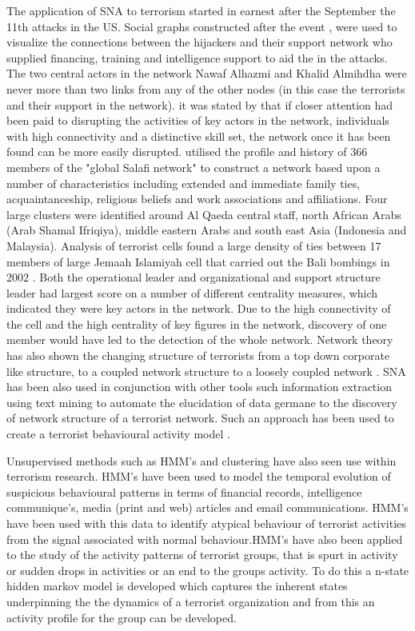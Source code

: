 The application of SNA to terrorism started in earnest after the September the 11th attacks in the US. Social graphs constructed after the event \citep{krebs2002mapping}, \citep{krebs2002uncloaking}  were used to visualize the connections between the hijackers and their support network who supplied financing, training and intelligence support to aid the in the attacks. The two central actors in the  network Nawaf Alhazmi and Khalid Almihdha were never more than two links from any of the other nodes (in this case the terrorists and their support in the network). it was stated by \citep{krebs2002mapping} that if closer attention had been paid to disrupting the activities of key actors in the network, individuals with high connectivity and a distinctive skill set, the network once it has been found can be more easily disrupted. \citep{sageman2004understanding} utilised the profile and history of 366 members of the "global Salafi network" to construct a network based upon a number of characteristics including extended and immediate family ties, acquaintanceship, religious beliefs and work associations and affiliations. Four large clusters were identified around Al Qaeda central staff, north African Arabs (Arab Shamal Ifriqiya), middle eastern Arabs and south east Asia (Indonesia and Malaysia). Analysis of terrorist cells found a large density of ties between 17 members of large Jemaah Islamiyah cell that carried out the Bali bombings in 2002 \citep{koschade2006social}. Both the operational leader and organizational and support structure leader had largest score on a number of different centrality measures, which indicated they were key actors in the network. Due to the high connectivity of the cell and the high centrality of key figures in the network, discovery of one member would have led to the detection of the whole network. Network theory has also shown the changing structure of terrorists from a top down corporate like structure, to a coupled network structure to a loosely coupled network \citep{jackson2006groups}. SNA has been also used in conjunction with other tools such information extraction using text mining to automate the elucidation of data germane to the discovery of network structure of a terrorist network. Such an approach has been used to create a terrorist behavioural activity model \citep{ball2016automating}.

Unsupervised methods such as HMM's and clustering have also seen use within terrorism research. HMM's have been used to model the temporal evolution of suspicious behavioural patterns in terms of financial records, intelligence communique's, media (print and web) articles and email communications. HMM's have been used with this data to identify atypical behaviour of terrorist activities from the signal associated with normal behaviour\citep{allanach2004detecting}.HMM's have also been applied to the study of the activity patterns of terrorist groups, that is spurt in activity or sudden drops in activities or an end to the groups activity. To do this a n-state hidden markov model is developed which captures the inherent states underpinning the the dynamics of a terrorist organization and from this an activity profile for the group can be developed.

